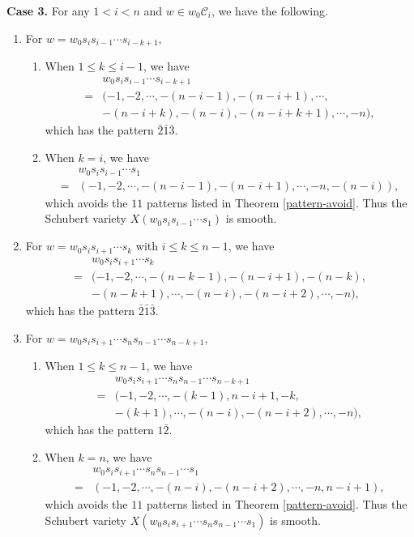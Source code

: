 \documentclass[11pt, reqno]{amsart}
\theoremstyle{definition}
\numberwithin{equation}{section}
\begin{document}
{\bf Case 3.} For any $1<i<n$ and $w\in w_0\mathcal{C}_i$, we have the following.
\begin{enumerate}
    \item  For $w=w_0s_is_{i-1}\cdots s_{i-k+1}$,
    \begin{enumerate}
        \item When $1\leq k\leq i-1$, we have
\begin{align*}
&w_0s_is_{i-1}\cdots s_{i-k+1}\\
=&(-1,-2,\cdots,-(n-i-1),-(n-i+1),\cdots,\\&-(n-i+k),-(n-i),-(n-i+k+1),\cdots,-n),
\end{align*}
which has the pattern $\bar{2}\bar{1}\bar{3}$.

\item  When $k=i$, we have
\begin{align*}
&w_0s_is_{i-1}\cdots s_{1}\\
=&(-1,-2,\cdots,-(n-i-1),-(n-i+1),\cdots,-n,-(n-i)),
\end{align*}
which avoids the $11$ patterns listed in Theorem \ref{pattern-avoid}. Thus the Schubert variety $X(w_0s_is_{i-1}\cdots s_1)$ is smooth.
    \end{enumerate}
    

\item  For $w=w_0s_is_{i+1}\cdots s_k$ with $i\leq k\leq n-1$, we have
\begin{align*}
&w_0s_is_{i+1}\cdots s_k\\
=&(-1,-2,\cdots,-(n-k-1),-(n-i+1),-(n-k),\\
&-(n-k+1),\cdots,-(n-i),-(n-i+2),\cdots,-n),
\end{align*}
which has the pattern $\bar{2}\bar{1}\bar{3}$.

\item For $w=w_0s_is_{i+1}\cdots s_ns_{n-1}\cdots s_{n-k+1}$,
\begin{enumerate}
    \item When $1\leq k\leq n-1$, we have
\begin{align*}
&w_0s_is_{i+1}\cdots s_ns_{n-1}\cdots s_{n-k+1}\\
=&(-1,-2,\cdots,-(k-1),n-i+1,-k,\\
&-(k+1),\cdots,-(n-i),-(n-i+2),\cdots,-n),
\end{align*}
which has the pattern $1\bar{2}$.

\item When $k=n$,  we have
\begin{align*}
&w_0s_is_{i+1}\cdots s_ns_{n-1}\cdots s_{1}\\
=&(-1,-2,\cdots,-(n-i),-(n-i+2),\cdots,-n,n-i+1),
\end{align*}
which avoids the $11$ patterns listed in Theorem \ref{pattern-avoid}. Thus the Schubert variety $X(w_0s_is_{i+1}\cdots s_ns_{n-1}\cdots s_{1})$ is smooth.
    
\end{enumerate}


\end{enumerate}
\end{document}
